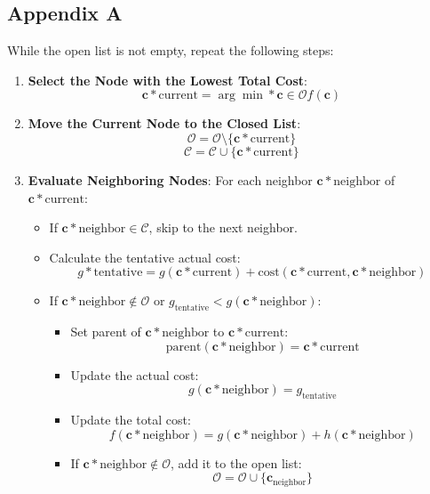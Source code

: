 \documentclass[12pt]{article}
\begin{document}
\subsection*{Appendix A}
While the open list is not empty, repeat the following steps:
\begin{enumerate}
\item \textbf{Select the Node with the Lowest Total Cost}:
\[
\mathbf{c}*{\text{current}} = \arg\min*{\mathbf{c} \in \mathcal{O}} f(\mathbf{c})
\]
\item \textbf{Move the Current Node to the Closed List}:
\[
\mathcal{O} = \mathcal{O} \setminus \{\mathbf{c}*{\text{current}}\}
\]
\[
\mathcal{C} = \mathcal{C} \cup \{\mathbf{c}*{\text{current}}\}
\]
\item \textbf{Evaluate Neighboring Nodes}:
For each neighbor \( \mathbf{c}*{\text{neighbor}} \) of \( \mathbf{c}*{\text{current}} \):
\begin{itemize}
\item If \( \mathbf{c}*{\text{neighbor}} \in \mathcal{C} \), skip to the next neighbor.
\item Calculate the tentative actual cost:
\[
g*{\text{tentative}} = g(\mathbf{c}*{\text{current}}) + \text{cost}(\mathbf{c}*{\text{current}}, \mathbf{c}*{\text{neighbor}})
\]
\item If \( \mathbf{c}*{\text{neighbor}} \notin \mathcal{O} \) or \( g_{\text{tentative}} < g(\mathbf{c}*{\text{neighbor}}) \):
\begin{itemize}
\item Set parent of \( \mathbf{c}*{\text{neighbor}} \) to \( \mathbf{c}*{\text{current}} \):
\[
\text{parent}(\mathbf{c}*{\text{neighbor}}) = \mathbf{c}*{\text{current}}
\]
\item Update the actual cost:
\[
g(\mathbf{c}*{\text{neighbor}}) = g_{\text{tentative}}
\]
\item Update the total cost:
\[
f(\mathbf{c}*{\text{neighbor}}) = g(\mathbf{c}*{\text{neighbor}}) + h(\mathbf{c}*{\text{neighbor}})
\]
\item If \( \mathbf{c}*{\text{neighbor}} \notin \mathcal{O} \), add it to the open list:
\[
\mathcal{O} = \mathcal{O} \cup \{\mathbf{c}_{\text{neighbor}}\}
\]
\end{itemize}
\end{itemize}
\end{enumerate}






\newpage
\end{document}
